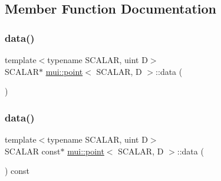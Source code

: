 \subsection{Member Function Documentation}
\mbox{\label{structmui_1_1point_ad5ad0ad637095c32d706442b0ce93160}} 
\subsubsection{\texorpdfstring{data()}{data()}\hspace{0.1cm}{\footnotesize\ttfamily [1/2]}}
{\footnotesize\ttfamily template$<$typename S\+C\+A\+L\+AR, uint D$>$ \\
S\+C\+A\+L\+AR$\ast$ \hyperlink{structmui_1_1point}{mui\+::point}$<$ S\+C\+A\+L\+AR, D $>$\+::data (\begin{DoxyParamCaption}{ }\end{DoxyParamCaption})\hspace{0.3cm}{\ttfamily [inline]}}

\mbox{\label{structmui_1_1point_a04e09e6c8e45ed86a0574f4a3c8a0318}} 
\subsubsection{\texorpdfstring{data()}{data()}\hspace{0.1cm}{\footnotesize\ttfamily [2/2]}}
{\footnotesize\ttfamily template$<$typename S\+C\+A\+L\+AR, uint D$>$ \\
S\+C\+A\+L\+AR const$\ast$ \hyperlink{structmui_1_1point}{mui\+::point}$<$ S\+C\+A\+L\+AR, D $>$\+::data (\begin{DoxyParamCaption}{ }\end{DoxyParamCaption}) const\hspace{0.3cm}{\ttfamily [inline]}}

\mbox{\label{structmui_1_1point_ab3ad1cc267f700bd30669325e6a44af4}} 

